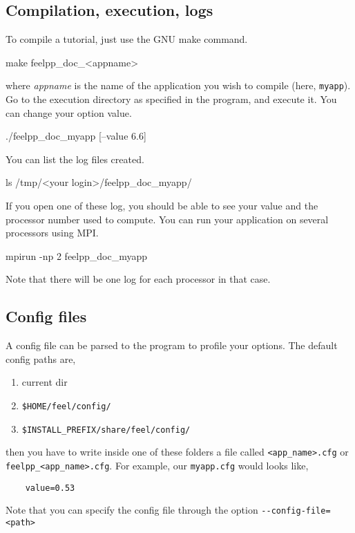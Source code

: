 \subsection{Compilation, execution, logs}

To compile a tutorial, just use the GNU make command.
%
\begin{unixcom}
    make feelpp_doc_<appname>
\end{unixcom}
%
where \textit{appname} is the name of the application you wish to
compile (here, \lstinline!myapp!).
Go to the execution directory as specified in the program,
and execute it. You can change your option value.
%
\begin{unixcom}
    ./feelpp_doc_myapp [--value 6.6]
\end{unixcom}
%
You can list the log files created.
%
\begin{unixcom}
    ls /tmp/<your login>/feelpp_doc_myapp/
\end{unixcom}
%
If you open one of these log,
you should be able to see your value and the processor number 
used to compute.
You can run your application on several processors using MPI.
%
\begin{unixcom}
    mpirun -np 2 feelpp_doc_myapp
\end{unixcom}
%
Note that there will be one log for each processor in that case.


\subsection{Config files}

A config file can be parsed to the program to profile your options.
The default config paths are,
\begin{enumerate}
    \item current dir
    \item \verb|$HOME/feel/config/|
    \item \verb|$INSTALL_PREFIX/share/feel/config/|
\end{enumerate}
then you have to write inside one of these folders a file called
\lstinline!<app_name>.cfg! or \lstinline!feelpp_<app_name>.cfg!.
For example, our \lstinline!myapp.cfg! would looks like,
%
\vspace{2mm}
\begin{lstlisting}
    value=0.53
\end{lstlisting}
\vspace{2mm}
%
Note that you can specify the config file through the option \lstinline!--config-file=<path>!

